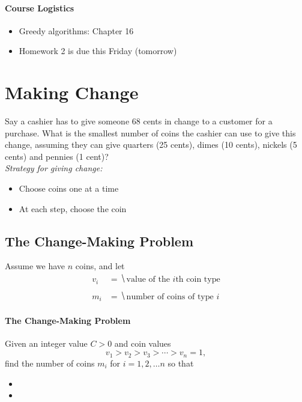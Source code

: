 \documentclass[11  pt]{article}
\begin{document}
	
	
	
	\paragraph{Course Logistics}
	
	\begin{itemize}
		\item Greedy algorithms: Chapter 16
		\item Homework 2 is due this Friday (tomorrow)
	\end{itemize}
	

	\section{Making Change}
	Say a cashier has to give someone 68 cents in change to a customer for a purchase. What is the smallest number of coins the cashier can use to give this change, assuming they can give quarters (25 cents), dimes (10 cents), nickels (5 cents) and pennies (1 cent)?\\
	
	\textit{Strategy for giving change:} 
	\begin{itemize}
		\item Choose coins one at a time
		\item At each step, choose the coin  %
	\end{itemize}


	
	\newpage
	\subsection{The Change-Making Problem}
	
	Assume we have $n$ coins, and let
	\begin{align*}
		v_i &=  \hide{ \text{value of the $i$th coin type}} \\ \\
		m_i  &= \hide{\text{number of coins of type $i$}}
	\end{align*}
	
	\paragraph{The Change-Making Problem} Given an integer value $C > 0$ and coin values $$v_1 > v_2 > v_3 > \cdots > v_n = 1,$$ find the number of coins $m_i$ for $i = 1, 2, \hdots n$ so that 
	\begin{itemize}
		\itemsep = 4em
		\item  %
		\item %
	\end{itemize}
	
\end{document}
